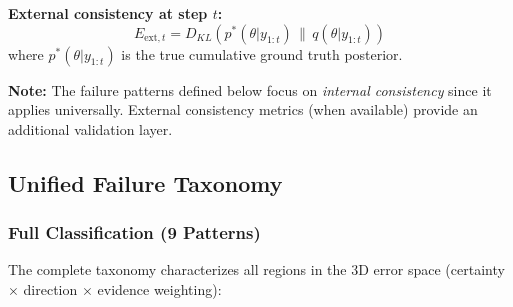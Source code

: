 \documentclass{article}
\theoremstyle{definition}
\begin{document}
\textbf{External consistency at step $t$:}
\begin{equation}
E_{\text{ext}, t} = D_{KL}(p^*(\theta|y_{1:t}) \,\|\, q(\theta|y_{1:t}))
\end{equation}
where $p^*(\theta|y_{1:t})$ is the true cumulative ground truth posterior.

\textbf{Note:} The failure patterns defined below focus on \emph{internal consistency} since it applies universally. External consistency metrics (when available) provide an additional validation layer.

\subsection{Unified Failure Taxonomy}

\subsubsection{Full Classification (9 Patterns)}

The complete taxonomy characterizes all regions in the 3D error space (certainty $\times$ direction $\times$ evidence weighting):
\end{document}

